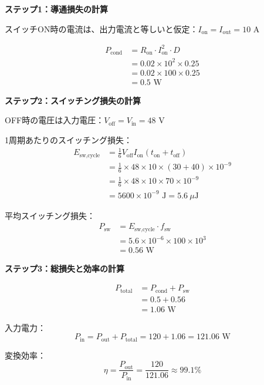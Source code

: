 \textbf{ステップ1：導通損失の計算}

スイッチON時の電流は、出力電流と等しいと仮定：$I_{\text{on}} = I_{\text{out}} = 10$ A

\begin{align}
P_{\text{cond}} &= R_{\text{on}} \cdot I_{\text{on}}^2 \cdot D \\
&= 0.02 \times 10^2 \times 0.25 \\
&= 0.02 \times 100 \times 0.25 \\
&= 0.5 \text{ W}
\end{align}

\textbf{ステップ2：スイッチング損失の計算}

OFF時の電圧は入力電圧：$V_{\text{off}} = V_{\text{in}} = 48$ V

1周期あたりのスイッチング損失：
\begin{align}
E_{\text{sw,cycle}} &= \frac{1}{6} V_{\text{off}} I_{\text{on}} (t_{\text{on}} + t_{\text{off}}) \\
&= \frac{1}{6} \times 48 \times 10 \times (30 + 40) \times 10^{-9} \\
&= \frac{1}{6} \times 48 \times 10 \times 70 \times 10^{-9} \\
&= 5600 \times 10^{-9} \text{ J} = 5.6~\mu\text{J}
\end{align}

平均スイッチング損失：
\begin{align}
P_{\text{sw}} &= E_{\text{sw,cycle}} \cdot f_{\text{sw}} \\
&= 5.6 \times 10^{-6} \times 100 \times 10^3 \\
&= 0.56 \text{ W}
\end{align}

\textbf{ステップ3：総損失と効率の計算}

\begin{align}
P_{\text{total}} &= P_{\text{cond}} + P_{\text{sw}} \\
&= 0.5 + 0.56 \\
&= 1.06 \text{ W}
\end{align}

入力電力：
\begin{equation}
P_{\text{in}} = P_{\text{out}} + P_{\text{total}} = 120 + 1.06 = 121.06 \text{ W}
\end{equation}

変換効率：
\begin{equation}
\eta = \frac{P_{\text{out}}}{P_{\text{in}}} = \frac{120}{121.06} \approx 99.1\%
\end{equation}

